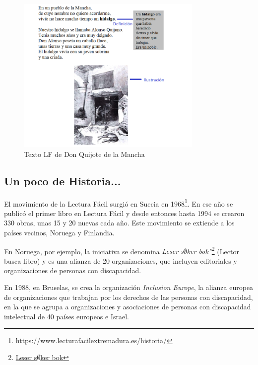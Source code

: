 \begin{figure}[htb]
	\centering
	\includegraphics[width=0.8\textwidth]{Imagenes/Ejemplos/Cap1DonQuijoteLF}
	\caption{Texto LF de Don Quijote de la Mancha}
	\label{fig:QuijoteLF}
\end{figure}


\subsection{Un poco de Historia...}
El movimiento de la Lectura Fácil surgió en Suecia en 1968\footnote{https://www.lecturafacilextremadura.es/historia/}. En ese año se publicó el primer libro en Lectura Fácil y desde entonces hasta 1994 se crearon 330 obras, unas 15 y 20 nuevas cada año. Este movimiento se extiende a los países vecinos, Noruega y Finlandia.

 \setlength{\parskip}{10pt}
 
En Noruega, por ejemplo, la iniciativa se denomina \textit{Leser s$\emptyset$ker bok”}\footnote{\href{https://lesersokerbok.no/english/}{Leser s$\emptyset$ker bok}} (Lector busca libro) y es una alianza de 20 organizaciones, que incluyen editoriales y organizaciones de personas con discapacidad.

 \setlength{\parskip}{10pt}
 
En 1988, en Bruselas, se crea la organización \textit{Inclusion Europe}, la alianza europea de organizaciones que trabajan por los derechos de las personas con discapacidad, en la que se agrupa a organizaciones y asociaciones de personas con discapacidad intelectual de 40 países europeos e Israel.

 \setlength{\parskip}{10pt}

